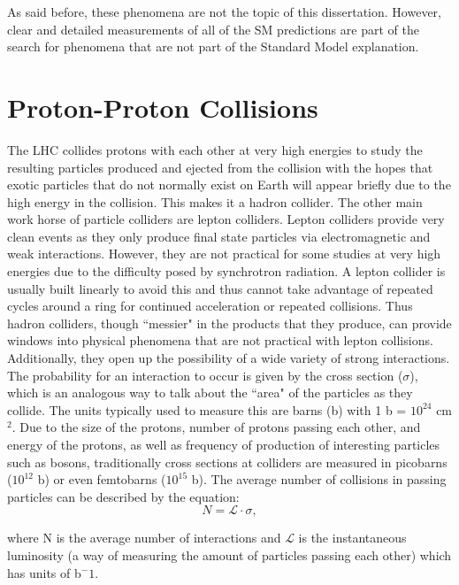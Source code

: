 As said before, these phenomena are not the topic of this dissertation. However, clear and detailed measurements of all of the SM predictions are part of the search for phenomena that are not part of the Standard Model explanation.

	\section{Proton-Proton Collisions} 
	\label{sec:pp_collisions}         
The LHC collides protons with each other at very high energies to study the resulting particles produced and ejected from the collision with the hopes that exotic particles that do not normally exist on Earth will appear briefly due to the high energy in the collision. This makes it a hadron collider. The other main work horse of particle colliders are lepton colliders. Lepton colliders provide very clean events as they only produce final state particles via electromagnetic and weak interactions. However, they are not practical for some studies at very high energies due to the difficulty posed by synchrotron radiation. A lepton collider is usually built linearly to avoid this and thus cannot take advantage of repeated cycles around a ring for continued acceleration or repeated collisions. Thus hadron colliders, though ``messier" in the products that they produce, can provide windows into physical phenomena that are not practical with lepton collisions. Additionally, they open up the possibility of a wide variety of strong interactions.\\

The probability for an interaction to occur is given by the cross section ($\sigma$), which is an analogous way to talk about the ``area" of the particles as they collide. The units typically used to measure this are barns (b) with 1 b = $10^{24}$ cm$^2$.  Due to the size of the protons, number of protons passing each other, and energy of the protons, as well as frequency of production of interesting particles such as bosons, traditionally cross sections at colliders are measured in picobarns ($10^{12}$ b) or even femtobarns ($10^{15}$ b). The average number of collisions in passing particles can be described by the equation:
\begin{equation}
\label{eq:lumi_xsec_relationship}
N = \mathcal{L} \cdot \sigma ,
\end{equation}

where N is the average number of interactions and $\mathcal{L}$ is the instantaneous luminosity (a way of measuring the amount of particles passing each other) which has units of b$^-1$.\\

